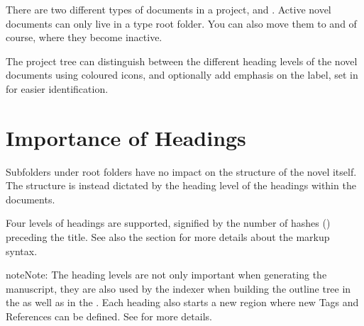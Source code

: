 \documentclass[a4paper,11pt,english]{sphinxmanual}
\begin{document}
\sphinxAtStartPar
There are two different types of documents in a project,  and .
Active novel documents can only live in a  type root folder. You can also move them to
 and  of course, where they become inactive.

\sphinxAtStartPar
The project tree can distinguish between the different heading levels of the novel documents using
coloured icons, and optionally add emphasis on the label, set in  for easier
identification.


\section{Importance of Headings}
\label{\detokenize{project_structure:importance-of-headings}}\label{\detokenize{project_structure:a-struct-heads}}
\sphinxAtStartPar
Subfolders under root folders have no impact on the structure of the novel itself. The structure is
instead dictated by the heading level of the headings within the documents.

\sphinxAtStartPar
Four levels of headings are supported, signified by the number of hashes (\sphinxcode{\sphinxupquote{\#}}) preceding the
title. See also the {\hyperref[\detokenize{usage_format:a-fmt}]{}} section for more details about the markup syntax.

\begin{sphinxadmonition}{note}{Note:}
\sphinxAtStartPar
The heading levels are not only important when generating the manuscript, they are also used by
the indexer when building the outline tree in the  as well as in the . Each heading also starts a new region where new Tags and References can be defined. See
{\hyperref[\detokenize{project_references:a-references}]{}} for more details.
\end{sphinxadmonition}
\end{document}
